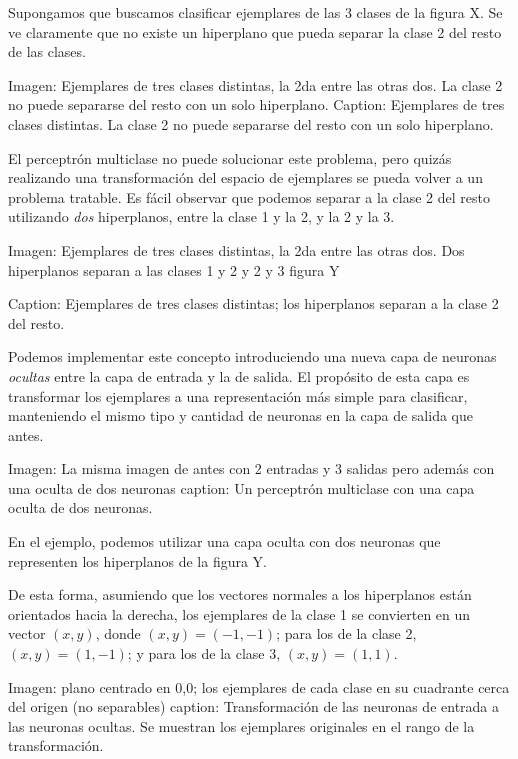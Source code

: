 Supongamos que buscamos clasificar ejemplares de las 3 clases de la figura X. Se ve claramente que no existe un hiperplano que pueda separar la clase 2 del resto de las clases. 

Imagen: Ejemplares de tres clases distintas, la 2da entre las otras dos. La clase 2 no puede separarse del resto con un solo hiperplano.
Caption: Ejemplares de tres clases distintas. La clase 2 no puede separarse del resto con un solo hiperplano.


El perceptrón multiclase no puede solucionar este problema, pero quizás realizando una transformación del espacio de ejemplares se pueda volver a un problema tratable. Es fácil observar que podemos separar a la clase 2 del resto utilizando \textit{dos} hiperplanos, entre la clase 1 y la 2, y la 2 y la 3.

Imagen: Ejemplares de tres clases distintas, la 2da entre las otras dos. Dos hiperplanos separan a las clases 1 y 2 y 2 y 3 figura Y

Caption: Ejemplares de tres clases distintas; los hiperplanos separan a la clase 2 del resto.

Podemos implementar este concepto introduciendo una nueva capa de neuronas \textit{ocultas} entre la capa de entrada y la de salida. El propósito de esta capa es transformar los ejemplares a una representación más simple para clasificar, manteniendo el mismo tipo y cantidad de neuronas en la capa de salida que antes. 

Imagen: La misma imagen de antes con 2 entradas y 3 salidas pero además con una oculta de dos neuronas
caption: Un perceptrón multiclase con una capa oculta de dos neuronas. 

En el ejemplo, podemos utilizar una capa oculta con dos neuronas que representen los hiperplanos de la figura Y.

De esta forma, asumiendo que los vectores normales a los hiperplanos están orientados hacia la derecha, los ejemplares de la clase 1 se convierten en un vector $(x,y)$, donde $(x,y)=(-1,-1)$; para los de la clase 2, $(x,y)=(1,-1)$; y para los de la clase 3, $(x,y)=(1,1)$. 


Imagen: plano centrado en 0,0; los ejemplares de cada clase en su cuadrante cerca del origen (no separables)
caption: Transformación de las neuronas de entrada a las neuronas ocultas. Se muestran los ejemplares originales en el rango de la transformación.


